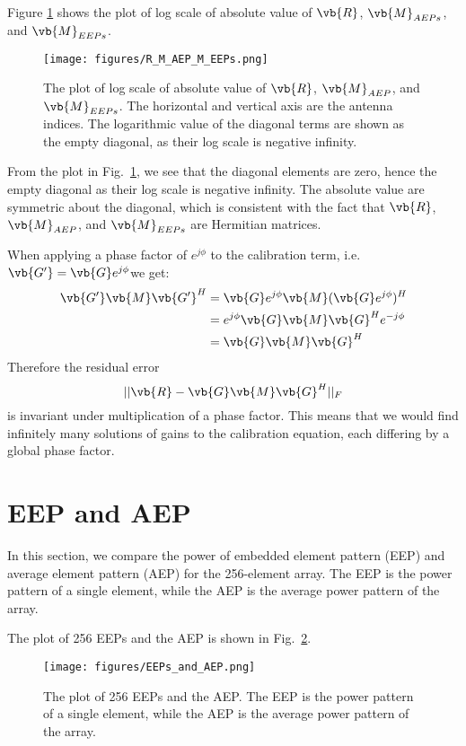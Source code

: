 \documentclass[10pt,a4paper,twocolumn]{article}
\begin{document}
Figure \ref{fig:R_M_AEP_M_EEPs} shows the plot of log scale of absolute value of $\vb{R}$, $\vb{M}_{AEPs}$, and $\vb{M}_{EEPs}$.

\begin{figure}[H]
    \centering
    \texttt{[image: figures/R\_M\_AEP\_M\_EEPs.png]}
    \caption{The plot of log scale of absolute value of $\vb{R}$, $\vb{M}_{AEP}$, and $\vb{M}_{EEPs}$. The horizontal and vertical axis are the antenna indices. The logarithmic value of the diagonal terms are shown as the empty diagonal, as their log scale is negative infinity.}
    \label{fig:R_M_AEP_M_EEPs}
\end{figure}

From the plot in Fig.~\ref{fig:R_M_AEP_M_EEPs}, we see that the diagonal elements are zero, hence the empty diagonal as their log scale is negative infinity. The absolute value are symmetric about the diagonal, which is consistent with the fact that $\vb{R}$, $\vb{M}_{AEP}$, and $\vb{M}_{EEPs}$ are Hermitian matrices.

When applying a phase factor of $e^{j\phi}$ to the calibration term, i.e. $\vb{G'} = \vb{G}e^{j\phi}$we get:
\begin{align*}
        \vb{G'}\vb{M}\vb{G'}^{H}
        &= \vb{G}e^{j\phi}\vb{M}(\vb{G}e^{j\phi})^{H}\\
        &= e^{j\phi}\vb{G}\vb{M}\vb{G}^{H}e^{-j\phi}\\
        &= \vb{G}\vb{M}\vb{G}^{H}
\end{align*}
Therefore the residual error 
\begin{equation}
    ||\vb{R} - \vb{G}\vb{M}\vb{G}^{H}||_{F}
    \label{eq:F_norm_error}
\end{equation}
is invariant under multiplication of a phase factor.
This means that we would find infinitely many solutions of gains to the calibration equation, each differing by a global phase factor. 

\section{EEP and AEP}
In this section, we compare the power of embedded element pattern (EEP) and average element pattern (AEP) for the 256-element array. The EEP is the power pattern of a single element, while the AEP is the average power pattern of the array.

The plot of 256 EEPs and the AEP is shown in Fig.~\ref{fig:EEPs_and_AEP}. 
\begin{figure}[H]
    \centering
    \texttt{[image: figures/EEPs\_and\_AEP.png]}
    \caption{The plot of 256 EEPs and the AEP. The EEP is the power pattern of a single element, while the AEP is the average power pattern of the array.}
    \label{fig:EEPs_and_AEP}
\end{figure}
\end{document}
